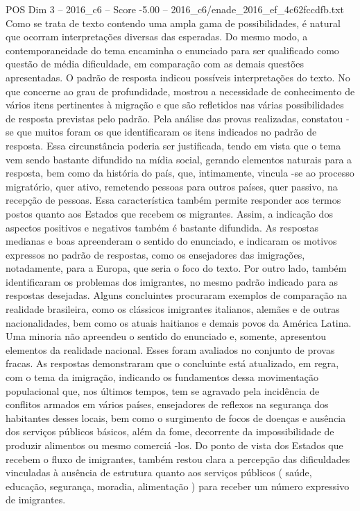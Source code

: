 \begin{textsample}{POS Dim 3 – 2016\_c6 – Score -5.00 – 2016\_c6/enade\_2016\_ef\_4c62fccdfb.txt}
Como se trata de texto contendo uma ampla gama de possibilidades, é natural que ocorram interpretações diversas das esperadas.
Do mesmo modo, a contemporaneidade do tema encaminha o enunciado para ser qualificado como questão de média dificuldade, em comparação com as demais questões apresentadas.
O padrão de resposta indicou possíveis interpretações do texto.
No que concerne ao grau de profundidade, mostrou a necessidade de conhecimento de vários itens pertinentes à migração e que são refletidos nas várias possibilidades de resposta previstas pelo padrão.
Pela análise das provas realizadas, constatou -se que muitos foram os que identificaram os itens indicados no padrão de resposta.
Essa circunstância poderia ser justificada, tendo em vista que o tema vem sendo bastante difundido na mídia social, gerando elementos naturais para a resposta, bem como da história do país, que, intimamente, vincula -se ao processo migratório, quer ativo, remetendo pessoas para outros países, quer passivo, na recepção de pessoas.
Essa característica também permite responder aos termos postos quanto aos Estados que recebem os migrantes.
Assim, a indicação dos aspectos positivos e negativos também é bastante difundida.
As respostas medianas e boas apreenderam o sentido do enunciado, e indicaram os motivos expressos no padrão de respostas, como os ensejadores das imigrações, notadamente, para a Europa, que seria o foco do texto.
Por outro lado, também identificaram os problemas dos imigrantes, no mesmo padrão indicado para as respostas desejadas.
Alguns concluintes procuraram exemplos de comparação na realidade brasileira, como os clássicos imigrantes italianos, alemães e de outras nacionalidades, bem como os atuais haitianos e demais povos da América Latina.
Uma minoria não apreendeu o sentido do enunciado e, somente, apresentou elementos da realidade nacional.
Esses foram avaliados no conjunto de provas fracas.
As respostas demonstraram que o concluinte está atualizado, em regra, com o tema da imigração, indicando os fundamentos dessa movimentação populacional que, nos últimos tempos, tem se agravado pela incidência de conflitos armados em vários países, ensejadores de reflexos na segurança dos habitantes desses locais, bem como o surgimento de focos de doenças e ausência dos serviços públicos básicos, além da fome, decorrente da impossibilidade de produzir alimentos ou mesmo comerciá -los.
Do ponto de vista dos Estados que recebem o fluxo de imigrantes, também restou clara a percepção das dificuldades vinculadas à ausência de estrutura quanto aos serviços públicos ( saúde, educação, segurança, moradia, alimentação ) para receber um número expressivo de imigrantes.

\end{textsample}

